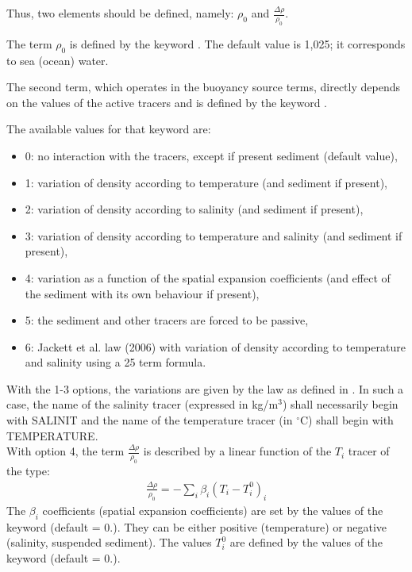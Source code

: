 Thus, two elements should be defined, namely: $\rho_{0} $ and $\frac{\Delta
\rho }{\rho _{0} } $.

The term $\rho _{0} $ is defined by the keyword .
The default value is 1,025; it corresponds to sea (ocean) water.

The second term, which operates in the buoyancy source terms, directly depends
on the values of the active tracers and is defined by the keyword
.

The available values for that keyword  are:

\begin{itemize}
\item 0: no interaction with the tracers, except if present sediment
(default value),

\item 1: variation of density according to temperature (and sediment if present),

\item 2: variation of density according to salinity (and sediment if present),

\item 3: variation of density according to temperature and salinity
(and sediment if present),

\item 4: variation as a function of the spatial expansion coefficients
(and effect of the sediment with its own behaviour if present),

\item 5: the sediment and other tracers are forced to be passive,

\item 6: Jackett et al. law (2006) with variation of density according to
         temperature and salinity using a 25 term formula.
\end{itemize}

With the 1-3 options, the variations are given by the law as defined in
. In such a case, the name of the salinity tracer (expressed in
kg/m${}^{3}$) shall necessarily begin with SALINIT and the name of the
temperature tracer (in ${}^\circ$C) shall begin with TEMPERATURE.\\

With option 4, the term $\frac{\Delta \rho }{\rho _{0} } $ is described by a
linear function of the $T_i$ tracer of the type:
\begin{align}
\frac{\Delta \rho }{\rho _{0} } =-\sum _{i}\beta _{i}  (T_{i} -T_{i}^{0} )_{i}
\end{align}
The $\beta_{i}$ coefficients (spatial expansion coefficients) are set by the
values of the keyword  (default
= 0.). They can be either positive (temperature) or negative (salinity,
suspended sediment). The values $T_{i}^{0}$ are defined by the values of the
keyword  (default = 0.).

